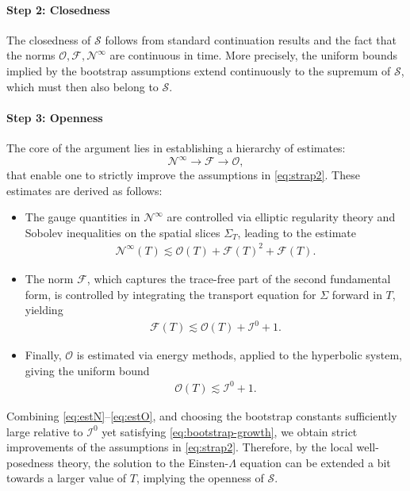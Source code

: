 \documentclass{amsart}
\begin{document}
\paragraph{Step 2: Closedness} The closedness of $\mathcal{S}$ follows from standard continuation results and the fact that the norms $\mathcal{O}, \mathcal{F}, \mathcal{N}^\infty$ are continuous in time. More precisely, the uniform bounds implied by the bootstrap assumptions extend continuously to the supremum of $\mathcal{S}$, which must then also belong to $\mathcal{S}$.

\paragraph{Step 3: Openness} The core of the argument lies in establishing a hierarchy of estimates:
\[
\mathcal{N}^\infty \longrightarrow \mathcal{F} \longrightarrow \mathcal{O},
\]
that enable one to strictly improve the assumptions in \eqref{eq:strap2}. These estimates are derived as follows:

\begin{itemize}
  \item The gauge quantities in $\mathcal{N}^\infty$ are controlled via elliptic regularity theory and Sobolev inequalities on the spatial slices $\Sigma_T$, leading to the estimate
  \begin{align} \label{eq:estN}
  \mathcal{N}^\infty(T) \lesssim \mathcal{O}(T) + \mathcal{F}(T)^2 + \mathcal{F}(T).
  \end{align}
  
  \item The norm $\mathcal{F}$, which captures the trace-free part of the second fundamental form, is controlled by integrating the transport equation for $\Sigma$ forward in $T$, yielding
  \begin{align} \label{eq:estF}
  \mathcal{F}(T) \lesssim \mathcal{O}(T) + \mathcal{I}^0 + 1.
  \end{align}
  
  \item Finally, $\mathcal{O}$ is estimated via energy methods, applied to the hyperbolic system, giving the uniform bound
  \begin{align} \label{eq:estO}
  \mathcal{O}(T) \lesssim \mathcal{I}^0 + 1.
  \end{align}
\end{itemize}

\noindent Combining \eqref{eq:estN}--\eqref{eq:estO}, and choosing the bootstrap constants sufficiently large relative to $\mathcal{I}^0$ yet satisfying \eqref{eq:bootstrap-growth}, we obtain strict improvements of the assumptions in \eqref{eq:strap2}. Therefore, by the local well-posedness theory, the solution to the Einsten-$\Lambda$ equation can be extended a bit towards a larger value of $T$, implying the openness of $\mathcal{S}$.
\end{document}
